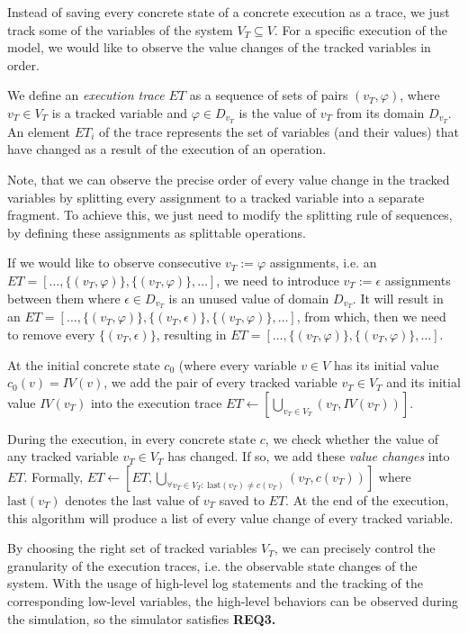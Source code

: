 Instead of saving every concrete state of a concrete execution as a trace, we just track some of the variables of the system $V_T \subseteq V$. For a specific execution of the model, we would like to observe the value changes of the tracked variables in order.

\begin{definition}
We define an \emph{execution trace} $ET$ as a sequence of sets of pairs $(v_T, \varphi)$, where $v_T \in V_T$ is a tracked variable and $\varphi \in D_{v_T}$ is the value of $v_T$ from its domain $D_{v_T}$. An element $ET_i$ of the trace represents the set of variables (and their values) that have changed as a result of the execution of an operation.
\end{definition}

Note, that we can observe the precise order of every value change in the tracked variables by splitting every assignment to a tracked variable into a separate fragment. To achieve this, we just need to modify the splitting rule of sequences, by defining these assignments as splittable operations.

If we would like to observe consecutive $v_T := \varphi$ assignments, i.e. an $ET = [ \ldots, \{(v_T, \varphi)\}, \{(v_T, \varphi)\}, \ldots ]$, we need to introduce $v_T := \epsilon$ assignments between them where $\epsilon \in D_{v_T}$ is an unused value of domain $D_{v_T}$. It will result in an $ET = [ \ldots, \{(v_T, \varphi)\}, \{(v_T, \epsilon)\}, \{(v_T, \varphi)\}, \ldots ]$, from which, then we need to remove every $ \{(v_T, \epsilon)\}$, resulting in $ET = [ \ldots, \{(v_T, \varphi)\}, \{(v_T, \varphi)\}, \ldots ]$.

At the initial concrete state $c_0$ (where every variable $v \in V$ has its initial value $c_0(v) = IV(v)$, we add the pair of every tracked variable $v_T \in V_T$ and its initial value $IV(v_T)$ into the execution trace $ET \leftarrow [ \bigcup_{v_T \in V_T} (v_T, IV(v_T)) ]$.

During the execution, in every concrete state $c$, we check whether the value of any tracked variable $v_T \in V_T$ has changed. If so, we add these \emph{value changes} into $ET$. Formally, $ET \leftarrow [ET, \bigcup_{\forall v_T \in V_T:\ \mathrm{last}(v_T) \neq c(v_T)} (v_T, c(v_T))]$ where $\mathrm{last}(v_T)$ denotes the last value of $v_T$ saved to $ET$. At the end of the execution, this algorithm will produce a list of every value change of every tracked variable.

By choosing the right set of tracked variables $V_T$, we can precisely control the granularity of the execution traces, i.e. the observable state changes of the system. With the usage of high-level log statements and the tracking of the corresponding low-level variables, the high-level behaviors can be observed during the simulation, so the simulator satisfies \textbf{REQ3.}

